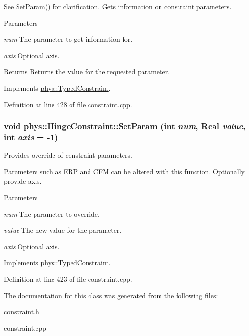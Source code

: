 See \hyperlink{classphys_1_1HingeConstraint_adec79d062d67532e3521eaae6b49f877}{SetParam()} for clarification. Gets information on constraint parameters. 
\begin{DoxyParams}{Parameters}
\item[{\em num}]The parameter to get information for. \item[{\em axis}]Optional axis. \end{DoxyParams}
\begin{DoxyReturn}{Returns}
Returns the value for the requested parameter. 
\end{DoxyReturn}


Implements \hyperlink{classphys_1_1TypedConstraint_ab6140d40e9476c3dc46e2802e8097421}{phys::TypedConstraint}.



Definition at line 428 of file constraint.cpp.

\hypertarget{classphys_1_1HingeConstraint_adec79d062d67532e3521eaae6b49f877}{
\subsubsection[{SetParam}]{\setlength{\rightskip}{0pt plus 5cm}void phys::HingeConstraint::SetParam (int {\em num}, \/  {\bf Real} {\em value}, \/  int {\em axis} = {\ttfamily -\/1})}}
\label{d3/d0d/classphys_1_1HingeConstraint_adec79d062d67532e3521eaae6b49f877}


Provides override of constraint parameters. 

Parameters such as ERP and CFM can be altered with this function. Optionally provide axis. 
\begin{DoxyParams}{Parameters}
\item[{\em num}]The parameter to override. \item[{\em value}]The new value for the parameter. \item[{\em axis}]Optional axis. \end{DoxyParams}


Implements \hyperlink{classphys_1_1TypedConstraint_a31a20a74094f0cb8e4f82d1f99725415}{phys::TypedConstraint}.



Definition at line 423 of file constraint.cpp.



The documentation for this class was generated from the following files:\begin{DoxyCompactItemize}
\item 
constraint.h\item 
constraint.cpp\end{DoxyCompactItemize}

